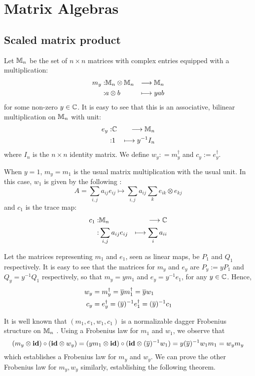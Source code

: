 
\section{Matrix Algebras}

\subsection{Scaled matrix product}

Let $\mathbb{M}_n$ be the set of $n \times n$ matrices with complex entries equipped
with a multiplication:
\begin{eqnarray*}
  m_y :& \mathbb{M}_n \otimes \mathbb{M}_n &\longrightarrow     \mathbb{M}_n \\
      :&  a   \otimes b    &\longmapsto yab
\end{eqnarray*}
for some non-zero $y \in \mathbb{C}$. It is easy to see that this is an associative,
bilinear multiplication on $\mathbb{M}_n$ with unit:
\begin{eqnarray*}
  e_y :& \mathbb{C} &\longrightarrow     \mathbb{M}_n \\
    :&  1 &\longmapsto y^{-1}I_n
\end{eqnarray*}
where $I_n$ is the $n \times n$ identity matrix. We define
$w_y : = m_y^{\dagger}$ and $c _y := e_y^{\dagger}$.

When $y = 1$, $m_y = m_1$ is the usual matrix multiplication with the usual
unit. In this case, $w_1$ is given by the following \cite[8]{CatQChan}:
\[
  A = \sum_{i, j} a_{ij}e_{ij}
    \mapsto \sum_{i, j} a_{ij} \sum_{k} e_{ik} \otimes e_{kj}
\]
and $c_1$ is the trace map:
\begin{eqnarray*}
  c_1 :& \mathbb{M}_n &\longrightarrow     \mathbb{C} \\
      :& \sum_{i, j} a_{ij}e_{ij} &\longmapsto \sum_{i} a_{ii}
\end{eqnarray*}

Let the matrices representing $m_1$ and $e_1$, seen as linear maps, be $P_1$ and
$Q_1$ respectively. It is easy to see that the matrices for $m_y$ and $e_y$ are
$P_y := yP_1$ and $Q_y = y^{-1}Q_1$ respectively, so that $m_y = ym_1$ and
$e_y = y^{-1}e_1$, for any $y \in \mathbb{C}$. Hence,
\begin{align*}
  w_y &= m_y^{\dagger} = \overline{y}m_1^{\dagger} = \overline{y}w_1 \\
  c_y &= e_y^{\dagger} = (\overline{y})^{-1}e_1^{\dagger} = (\overline{y})^{-1}c_1
\end{align*}

It is well known that $(m_1, e_1, w_1, c_1)$ is a normalizable dagger Frobenius
structure on $\mathbb{M}_n$ \cite[8, 10]{CatQChan}. Using a Frobenius law for $m_1$
and $w_1$, we observe that
\[
  (m_y \otimes \textbf{id}) \circ (\textbf{id} \otimes w_y)
  = (ym_1 \otimes \textbf{id}) \circ (\textbf{id} \otimes (\overline{y})^{-1}w_1)
  = y(\overline{y})^{-1}w_1m_1
  = w_ym_y
\]
which establishes a Frobenius law for $m_y$ and $w_y$. We can prove the other
Frobenius law for $m_y, w_y$ similarly, establishing the following theorem.

